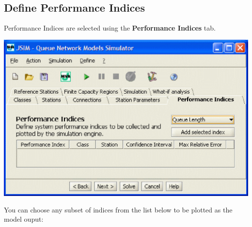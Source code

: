 \subsection{Define Performance Indices}
\label{sec:DefinePerformanceIndices}
Performance Indices are selected using the \textbf{Performance Indices} tab.
\begin{center}
\includegraphics[scale=.5]{img/jsim/define_indices1.eps}
\end{center}
You can choose any subset of indices from the list below to be plotted as the model ouput:
